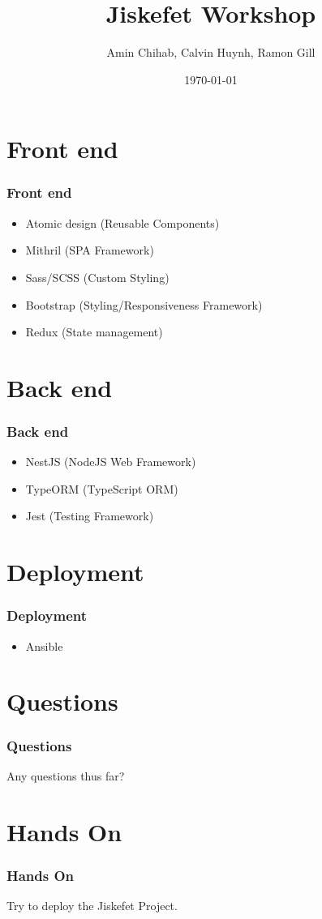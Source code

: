 \documentclass[12pt]{beamer}
\title{Jiskefet Workshop}
\author{Amin Chihab, Calvin Huynh, Ramon Gill}
\date{\today}
\begin{document}
	\begin{frame}\end{itemize}
	\titlepage
	\end{frame}
	     
    \section{Front end}
	\begin{frame}
		\frametitle{Front end}
		\begin{itemize}
			\item Atomic design	(Reusable Components)	
            \item Mithril (SPA Framework)
            \item Sass/SCSS (Custom Styling)
            \item Bootstrap (Styling/Responsiveness Framework)
            \item Redux (State management)                                              
		\end{itemize}
	\end{frame}

    \section{Back end}
	\begin{frame}
		\frametitle{Back end}
		\begin{itemize}
			\item NestJS (NodeJS Web Framework)
            \item TypeORM (TypeScript ORM)
            \item Jest (Testing Framework)        
		\end{itemize}
	\end{frame}

    \section{Deployment}
	\begin{frame}
	    \frametitle{Deployment}
		\begin{itemize}
			\item Ansible 
		\end{itemize}
	\end{frame}

    \section{Questions}
    \begin{frame}   
        \frametitle{Questions}
        Any questions thus far?		
	\end{frame}

    \section{Hands On}
    \begin{frame}
	    \frametitle{Hands On}
		 Try to deploy the Jiskefet Project.       
    \end{frame}
    
\end{document}
